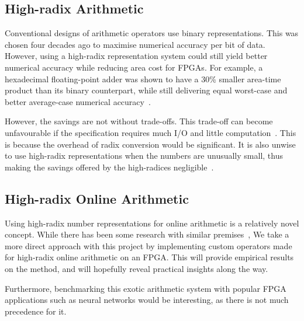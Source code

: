 \subsection{High-radix Arithmetic}
Conventional designs of arithmetic operators use binary representations.
This was chosen four decades ago to maximise numerical accuracy per bit of data.
However, using a high-radix representation system could still yield better
numerical accuracy while reducing area cost for FPGAs.
For example, a hexadecimal floating-point adder was shown to have a 30\% smaller
area-time product than its binary counterpart, while still delivering equal
worst-case and better average-case numerical accuracy~\cite{Catanzaro1}.

However, the savings are not without trade-offs.
This trade-off can become unfavourable if the specification requires much I/O
and little computation~\cite{Whyte1}.
This is because the overhead of radix conversion would be significant.
It is also unwise to use high-radix representations when the numbers are
unusually small, thus making the savings offered by the high-radices
negligible~\cite{Catanzaro1}.

\subsection{High-radix Online Arithmetic}
Using high-radix number representations for online arithmetic is a
relatively novel concept.
While there has been some research with similar
premises~\cite{Lynch1}\cite{Lynch2},
We take a more direct approach with this project by implementing custom
operators made for high-radix online arithmetic on an FPGA.
This will provide empirical results on the method, and will hopefully reveal
practical insights along the way.

Furthermore, benchmarking this exotic arithmetic system with popular FPGA
applications such as neural networks would be interesting, as there is not
much precedence for it.
